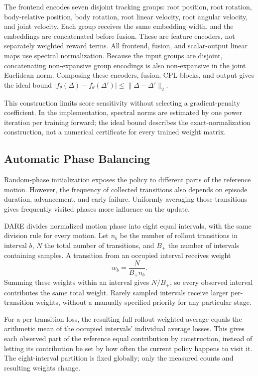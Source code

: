 \documentclass[letterpaper,10pt,conference]{ieeeconf}
\begin{document}
The frontend encodes seven disjoint tracking groups: root position, root
rotation, body-relative position, body rotation, root linear velocity,
root angular velocity, and joint velocity. Each group receives the same
embedding width, and the embeddings are concatenated before fusion.
These are feature encoders, not separately weighted reward terms.
All frontend, fusion, and scalar-output linear maps use spectral
normalization. Because the input groups are disjoint, concatenating
non-expansive group encodings is also non-expansive in the joint Euclidean
norm. Composing these encoders, fusion, CPL blocks, and output gives the
ideal bound $|f_\theta(\Delta)-f_\theta(\Delta')|
\leq\|\Delta-\Delta'\|_2$.

This construction limits score sensitivity without selecting a
gradient-penalty coefficient. In the implementation, spectral norms are
estimated by one power iteration per training forward; the ideal bound
describes the exact-normalization construction, not a numerical
certificate for every trained weight matrix.

\subsection{Automatic Phase Balancing}
Random-phase initialization exposes the policy to different parts of the
reference motion. However, the frequency of collected transitions also
depends on episode duration, advancement, and early failure. Uniformly
averaging those transitions gives frequently visited phases more influence
on the update.

DARE divides normalized motion phase into eight equal intervals, with the
same division rule for every motion. Let $n_b$ be the number of rollout
transitions in interval $b$, $N$ the total number of transitions, and
$B_+$ the number of intervals containing samples. A transition from an
occupied interval receives weight
\begin{equation}
w_b=\frac{N}{B_+n_b}.
\label{eq:phase}
\end{equation}
Summing these weights within an interval gives $N/B_+$, so every observed
interval contributes the same total weight. Rarely sampled intervals
receive larger per-transition weights, without a manually specified
priority for any particular stage.

For a per-transition loss, the resulting full-rollout weighted average
equals the arithmetic mean of the occupied intervals' individual average
losses. This gives each observed part of the reference equal contribution
by construction, instead of letting its contribution be set by how often
the current policy happens to visit it. The eight-interval partition is
fixed globally; only the measured counts and resulting weights change.
\end{document}
